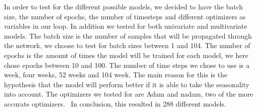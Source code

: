 In order to test for the different possible models, we decided to have the batch size, the number of epochs, the number of timesteps and different optimizers as variables in our loop. In addition we tested for both univariate and multivariate models. The batch size is the number of samples that will be propagated through the network, we choose to test for batch sizes between 1 and 104. The number of epochs is the amount of times the model will be trained for each model, we here chose epochs between 10 and 100. The number of time steps we chose to use is a week, four weeks, 52 weeks and 104 week. The main reason for this is the hypothesis that the model will perform better if it is able to take the seasonality into account. The optimizers we tested for are Adam and nadam, two of the more accurate optimizers.~\parencite{zaman2021} In conclusion, this resulted in 288 different models.